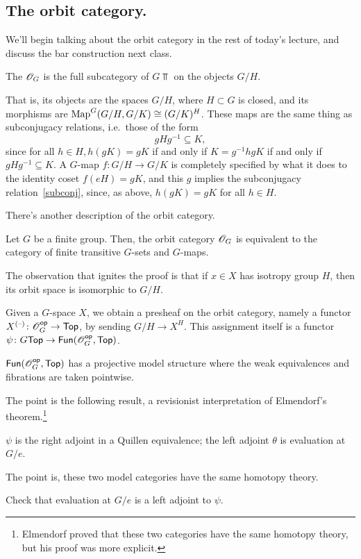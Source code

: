 \subsection*{The orbit category.}
We'll begin talking about the orbit category in the rest of today's lecture, and discuss the bar construction next
class.
\begin{defn}
The  $\mathscr O_G$ is the full subcategory of $G\Top$ on the objects $G/H$.
\end{defn}
That is, its objects are the spaces $G/H$, where $H\subset G$ is closed, and its morphisms are $\operatorname{Map}^G(G/H,
G/K)\cong (G/K)^H$. These maps are the same thing as subconjugacy relations, i.e.\ those of the form
\begin{equation}
\label{subconj}
gHg^{-1}\subseteq K,
\end{equation}
since for all $h \in H, h(gK) = gK$ if and only if $K = g^{-1}hgK$ if and only if $gHg^{-1} \subseteq K$.  A
$G$-map $f\colon G/H\to G/K$ is completely specified by what it does to the identity coset $f(eH) = gK$, and this
$g$ implies the subconjugacy relation~\eqref{subconj}, since, as above, $h(gK) = gK$ for all $h \in H$.

There's another description of the orbit category.
\begin{prop}
Let $G$ be a finite group. Then, the orbit category $\mathscr O_G$ is equivalent to the category of finite transitive
$G$-sets and $G$-maps.
\end{prop}
The observation that ignites the proof is that if $x\in X$ has isotropy group $H$, then its orbit space is
isomorphic to $G/H$.
\begin{defn}
Given a $G$-space $X$, we obtain a presheaf on the orbit category, namely a functor
$X^{(\text{--})}\colon\mathscr O_G^{\mathsf{op}}\to\mathsf{Top}$, by sending $G/H\to X^H$. This assignment itself is a functor $\psi\colon
G\mathsf{Top}\to\mathsf{Fun}(\mathscr O_G^{\mathsf{op}}, \mathsf{Top})$.
\end{defn}
\begin{prop}
$\mathsf{Fun}(\mathscr O_G^{\mathsf{op}}, \mathsf{Top})$ has a projective model structure where the weak equivalences and fibrations are taken
pointwise.
\end{prop}
The point is the following result, a revisionist interpretation of Elmendorf's theorem.\footnote{Elmendorf proved
that these two categories have the same homotopy theory, but his proof was more explicit.}
\begin{thm}
\label{revElmen}
$\psi$ is the right adjoint in a Quillen equivalence; the left adjoint $\theta$ is evaluation at $G/e$.
\end{thm}
The point is, these two model categories have the same homotopy theory.
\begin{ex}
Check that evaluation at $G/e$ is a left adjoint to $\psi$.
\end{ex}
